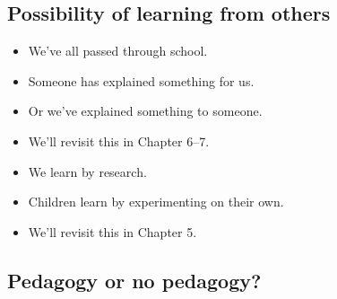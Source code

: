 \subsection{Possibility of learning from others}

\begin{frame}
  \begin{example}
    \begin{itemize}
      \item We've all passed through school.
      \item Someone has explained something for us.
      \item Or we've explained something to someone.
    \end{itemize}
  \end{example}

  \pause

  \begin{remark}
    \begin{itemize}
      \item We'll revisit this in Chapter 6--7.
    \end{itemize}
  \end{remark}
\end{frame}

\begin{frame}
  \begin{example}
    \begin{itemize}
      \item We learn by research.
      \item Children learn by experimenting on their own.
    \end{itemize}
  \end{example}

  \pause
  
  \begin{remark}
    \begin{itemize}
      \item We'll revisit this in Chapter 5.
    \end{itemize}
  \end{remark}
\end{frame}

\subsection{Pedagogy or no pedagogy?}

